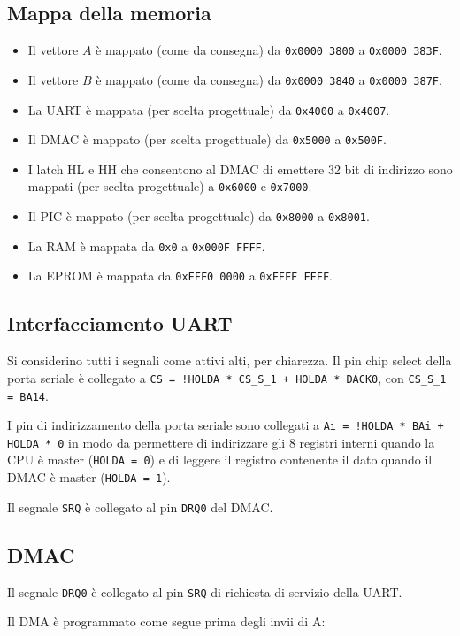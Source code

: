 \documentclass[a4paper]{article}
\begin{document}
\subsection{Mappa della memoria}
\begin{itemize}
\item Il vettore $A$ è mappato (come da consegna) da \texttt{0x0000 3800} a \texttt{0x0000 383F}.
\item Il vettore $B$ è mappato (come da consegna) da \texttt{0x0000 3840} a \texttt{0x0000 387F}.
\item La UART è mappata (per scelta progettuale) da \texttt{0x4000} a \texttt{0x4007}.
\item Il DMAC è mappato (per scelta progettuale) da \texttt{0x5000} a \texttt{0x500F}.
\item I latch HL e HH che consentono al DMAC di emettere 32 bit di indirizzo sono mappati (per scelta progettuale) a \texttt{0x6000} e \texttt{0x7000}.
\item Il PIC è mappato (per scelta progettuale) da \texttt{0x8000} a \texttt{0x8001}.
\item La RAM è mappata da \texttt{0x0} a \texttt{0x000F FFFF}. 
\item La EPROM è mappata da \texttt{0xFFF0 0000} a \texttt{0xFFFF FFFF}.
\end{itemize}
\subsection{Interfacciamento UART}
Si considerino tutti i segnali come attivi alti, per chiarezza.
Il pin chip select della porta seriale è collegato a \texttt{CS = !HOLDA * CS\_S\_1 + HOLDA * DACK0}, con \texttt{CS\_S\_1 = BA14}.

I pin di indirizzamento della porta seriale sono collegati a \texttt{Ai = !HOLDA * BAi + HOLDA * 0} in modo da permettere di indirizzare gli 8 registri interni quando la CPU è master (\texttt{HOLDA = 0}) e di leggere il registro contenente il dato quando il DMAC è master (\texttt{HOLDA = 1}).

Il segnale \texttt{SRQ} è collegato al pin \texttt{DRQ0} del DMAC.
\subsection{DMAC}
Il segnale \texttt{DRQ0} è collegato al pin \texttt{SRQ} di richiesta di servizio della UART.

Il DMA è programmato come segue prima degli invii di A:
\end{document}
